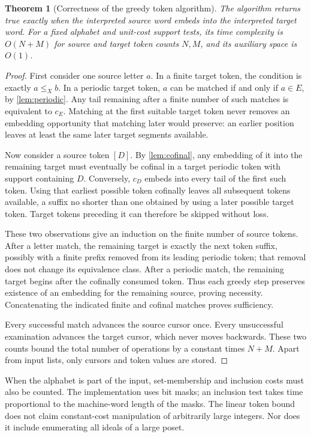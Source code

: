 \documentclass[11pt]{article}
\numberwithin{equation}{section}
\newtheorem{theorem}{Theorem}[section]
\theoremstyle{plain}
\theoremstyle{definition}
\theoremstyle{remark}
\begin{document}
\begin{theorem}[Correctness of the greedy token algorithm]\label{thm:algorithm}
The algorithm returns true exactly when the interpreted source word embeds into the interpreted target word. For a fixed alphabet and unit-cost support tests, its time complexity is $O(N+M)$ for source and target token counts $N,M$, and its auxiliary space is $O(1)$.
\end{theorem}
\begin{proof}
First consider one source letter $a$. In a finite target token, the condition is exactly $a\leq_X b$. In a periodic target token, $a$ can be matched if and only if $a\in E$, by \cref{lem:periodic}. Any tail remaining after a finite number of such matches is equivalent to $c_E$. Matching at the first suitable target token never removes an embedding opportunity that matching later would preserve: an earlier position leaves at least the same later target segments available.

Now consider a source token $[D]$. By \cref{lem:cofinal}, any embedding of it into the remaining target must eventually be cofinal in a target periodic token with support containing $D$. Conversely, $c_D$ embeds into every tail of the first such token. Using that earliest possible token cofinally leaves all subsequent tokens available, a suffix no shorter than one obtained by using a later possible target token. Target tokens preceding it can therefore be skipped without loss.

These two observations give an induction on the finite number of source tokens. After a letter match, the remaining target is exactly the next token suffix, possibly with a finite prefix removed from its leading periodic token; that removal does not change its equivalence class. After a periodic match, the remaining target begins after the cofinally consumed token. Thus each greedy step preserves existence of an embedding for the remaining source, proving necessity. Concatenating the indicated finite and cofinal matches proves sufficiency.

Every successful match advances the source cursor once. Every unsuccessful examination advances the target cursor, which never moves backwards. These two counts bound the total number of operations by a constant times $N+M$. Apart from input lists, only cursors and token values are stored.
\end{proof}

When the alphabet is part of the input, set-membership and inclusion costs must also be counted. The implementation uses bit masks; an inclusion test takes time proportional to the machine-word length of the masks. The linear token bound does not claim constant-cost manipulation of arbitrarily large integers. Nor does it include enumerating all ideals of a large poset.
\end{document}
